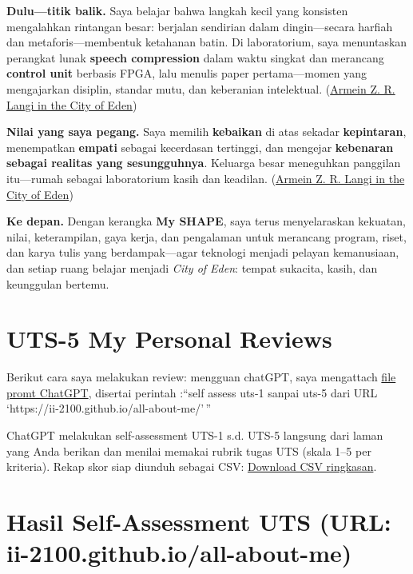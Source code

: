 \documentclass[
  letterpaper,
  DIV=11,
  numbers=noendperiod]{scrreprt}
\begin{document}
\textbf{Dulu---titik balik.} Saya belajar bahwa langkah kecil yang
konsisten mengalahkan rintangan besar: berjalan sendirian dalam
dingin---secara harfiah dan metaforis---membentuk ketahanan batin. Di
laboratorium, saya menuntaskan perangkat lunak \textbf{speech
compression} dalam waktu singkat dan merancang \textbf{control unit}
berbasis FPGA, lalu menulis paper pertama---momen yang mengajarkan
disiplin, standar mutu, dan keberanian intelektual.
(\href{https://ii-2100.github.io/all-about-me/My_Stories_for_You/index.html}{Armein
Z. R. Langi in the City of Eden})

\textbf{Nilai yang saya pegang.} Saya memilih \textbf{kebaikan} di atas
sekadar \textbf{kepintaran}, menempatkan \textbf{empati} sebagai
kecerdasan tertinggi, dan mengejar \textbf{kebenaran sebagai realitas
yang sesungguhnya}. Keluarga besar meneguhkan panggilan itu---rumah
sebagai laboratorium kasih dan keadilan.
(\href{https://azrl.wordpress.com/2010/01/09/on-being-nice/?utm_source=chatgpt.com}{Armein
Z. R. Langi in the City of Eden})

\textbf{Ke depan.} Dengan kerangka \textbf{My SHAPE}, saya terus
menyelaraskan kekuatan, nilai, keterampilan, gaya kerja, dan pengalaman
untuk merancang program, riset, dan karya tulis yang berdampak---agar
teknologi menjadi pelayan kemanusiaan, dan setiap ruang belajar menjadi
\emph{City of Eden}: tempat sukacita, kasih, dan keunggulan bertemu.


\chapter{UTS-5 My Personal Reviews}\label{uts-5-my-personal-reviews}

Berikut cara saya melakukan review: mengguan chatGPT, saya mengattach
\href{skor_uts.pdf}{file promt ChatGPT}, disertai perintah :``self
assess uts-1 sanpai uts-5 dari URL
`https://ii-2100.github.io/all-about-me/'\,''

ChatGPT melakukan self-assessment UTS-1 s.d. UTS-5 langsung dari laman
yang Anda berikan dan menilai memakai rubrik tugas UTS (skala 1--5 per
kriteria). Rekap skor siap diunduh sebagai CSV:
\href{sandbox:/mnt/data/UTS_self_assessment.csv}{Download CSV
ringkasan}.


\chapter{Hasil Self-Assessment UTS (URL:
ii-2100.github.io/all-about-me)}\label{hasil-self-assessment-uts-url-ii-2100.github.ioall-about-me}
\end{document}

